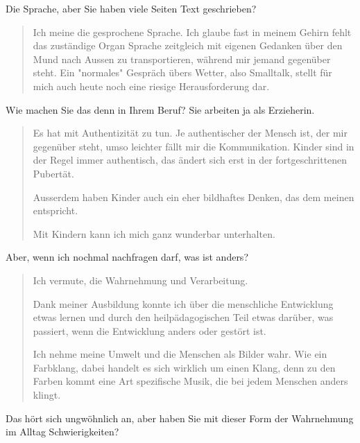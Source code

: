 \documentclass[10pt,titlepage,a5paper]{book}
\newenvironment{tg}{\begin{quote}\em}{\end{quote}}
\begin{document}
 Die Sprache, aber Sie haben viele Seiten Text geschrieben?
 
 \begin{tg}
 
 Ich meine die gesprochene Sprache. Ich glaube fast in meinem Gehirn fehlt das zuständige Organ Sprache zeitgleich mit eigenen Gedanken über den Mund nach Aussen zu transportieren, während mir jemand gegenüber steht. Ein "normales" Gespräch übers Wetter, also Smalltalk, stellt für mich auch heute noch eine riesige Herausforderung dar.
 
 \end{tg}
 
Wie machen Sie das denn in Ihrem Beruf? Sie arbeiten ja als Erzieherin.

\begin{tg}
 

Es hat mit Authentizität zu tun. Je authentischer der Mensch ist, der mir gegenüber steht, umso leichter fällt mir die Kommunikation. Kinder sind in der Regel immer authentisch, das ändert sich erst in der fortgeschrittenen Pubertät.

Ausserdem haben Kinder auch ein eher bildhaftes Denken, das dem meinen entspricht.

Mit Kindern kann ich mich ganz wunderbar unterhalten.



\end{tg}

Aber, wenn ich nochmal nachfragen darf, was ist anders?

\begin{tg}

Ich vermute, die Wahrnehmung und Verarbeitung.

Dank meiner Ausbildung konnte ich über die menschliche Entwicklung etwas lernen und durch den heilpädagogischen Teil etwas darüber, was passiert, wenn die Entwicklung anders oder gestört ist.
 
Ich nehme meine Umwelt und die Menschen als Bilder wahr. Wie ein Farbklang, dabei handelt es sich wirklich um einen Klang, denn zu den Farben kommt eine Art spezifische Musik, die bei jedem Menschen anders klingt.

\end{tg}

Das hört sich ungwöhnlich an, aber haben Sie mit dieser Form der Wahrnehmung im Alltag Schwierigkeiten?
\end{document}
